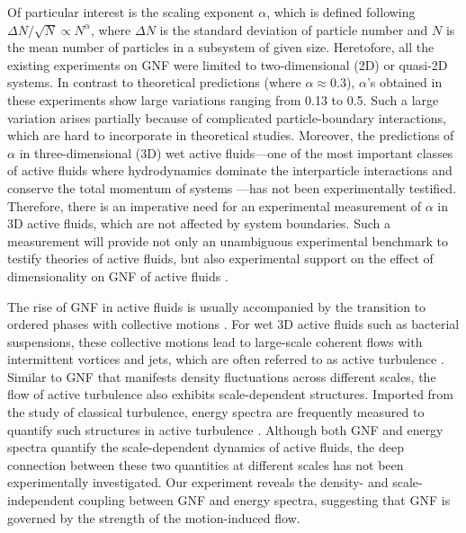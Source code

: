 Of particular interest is the scaling exponent $\alpha$, which is defined following $\Delta N /\sqrt N \propto N^\alpha$, where $\Delta N$ is the standard deviation of particle number and $N$ is the mean number of particles in a subsystem of given size. Heretofore, all the existing experiments on GNF were limited to two-dimensional (2D) or quasi-2D systems. In contrast to theoretical predictions (where $\alpha \approx 0.3$), $\alpha$'s obtained in these experiments show large variations ranging from 0.13 to 0.5. Such a large variation arises partially because of complicated particle-boundary interactions, which are hard to incorporate in theoretical studies. Moreover, the predictions of $\alpha$ in three-dimensional (3D) wet active fluids---one of the most important classes of active fluids where hydrodynamics dominate the interparticle interactions and conserve the total momentum of systems \cite{Marchetti2013}---has not been experimentally testified. Therefore, there is an imperative need for an experimental measurement of $\alpha$ in 3D active fluids, which are not affected by system boundaries. Such a measurement will provide not only an unambiguous experimental benchmark to testify theories of active fluids, but also experimental support on the effect of dimensionality on GNF of active fluids \cite{Marchetti2013}.

The rise of GNF in active fluids is usually accompanied by the transition to ordered phases with collective motions \cite{Ramaswamy2010,Marchetti2013}. For wet 3D active fluids such as bacterial suspensions, these collective motions lead to large-scale coherent flows with intermittent vortices and jets, which are often referred to as active turbulence \cite{Wolgemuth2008,Wensink2012,Dunkel2013a,Bratanov2015,Guo2018,Linkmann2019,Bardfalvy2019,Alert2020,Skultety2020,Peng2020}. Similar to GNF that manifests density fluctuations across different scales, the flow of active turbulence also exhibits scale-dependent structures.
Imported from the study of classical turbulence, energy spectra are frequently measured to quantify such structures in active turbulence \cite{Ishikawa2011,Wensink2012,Dunkel2013a,Giomi2015,Creppy2015,Patteson2018,Alert2020}. Although both GNF and energy spectra quantify the scale-dependent dynamics of active fluids, the deep connection between these two quantities at different scales has not been experimentally investigated. Our experiment reveals the density- and scale- independent coupling between GNF and energy spectra, suggesting that GNF is governed by the strength of the motion-induced flow.

